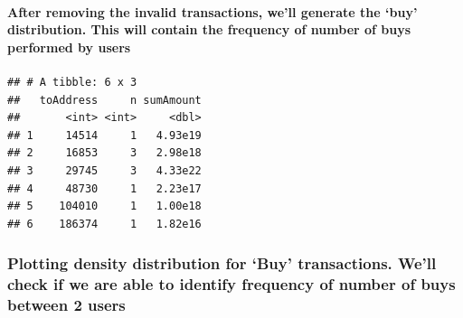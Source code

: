 \documentclass[]{article}
\newenvironment{Shaded}{\begin{snugshade}}{\end{snugshade}}
\newcommand{\KeywordTok}[1]{\textcolor[rgb]{0.13,0.29,0.53}{\textbf{#1}}}
\newcommand{\DataTypeTok}[1]{\textcolor[rgb]{0.13,0.29,0.53}{#1}}
\newcommand{\StringTok}[1]{\textcolor[rgb]{0.31,0.60,0.02}{#1}}
\newcommand{\CommentTok}[1]{\textcolor[rgb]{0.56,0.35,0.01}{\textit{#1}}}
\newcommand{\OperatorTok}[1]{\textcolor[rgb]{0.81,0.36,0.00}{\textbf{#1}}}
\newcommand{\NormalTok}[1]{#1}
\let\oldparagraph\paragraph
\renewcommand{\paragraph}[1]{\oldparagraph{#1}\mbox{}}
\begin{document}
\paragraph{\texorpdfstring{After removing the invalid transactions,
we'll generate the `buy' distribution. This will contain the frequency
of number of buys performed by
users}{After removing the invalid transactions, we'll generate the buy distribution. This will contain the frequency of number of buys performed by users}}\label{after-removing-the-invalid-transactions-well-generate-the-buy-distribution.-this-will-contain-the-frequency-of-number-of-buys-performed-by-users-1}

\begin{Shaded}
\end{Shaded}

\begin{verbatim}
## # A tibble: 6 x 3
##   toAddress     n sumAmount
##       <int> <int>     <dbl>
## 1     14514     1   4.93e19
## 2     16853     3   2.98e18
## 3     29745     3   4.33e22
## 4     48730     1   2.23e17
## 5    104010     1   1.00e18
## 6    186374     1   1.82e16
\end{verbatim}

\subsubsection{\texorpdfstring{Plotting density distribution for `Buy'
transactions. We'll check if we are able to identify frequency of number
of buys between 2
users}{Plotting density distribution for Buy transactions. We'll check if we are able to identify frequency of number of buys between 2 users}}\label{plotting-density-distribution-for-buy-transactions.-well-check-if-we-are-able-to-identify-frequency-of-number-of-buys-between-2-users-1}
\end{document}
